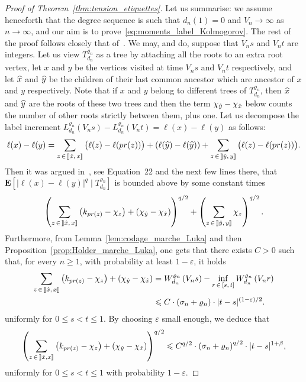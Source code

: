 \documentclass[10pt]{amsart}
\theoremstyle{definition}\newtheorem{defi}[theo]{Definition}\newtheorem{rema}[theo]{Remark}\newtheorem{exam}[theo]{Example}\newtheorem{exem}[theo]{Example}\newtheorem{nota}[theo]{Notation}
\newcommand{\rrbracket}{\mathclose{]\mkern -2.7mu]}}
\newcommand{\ensembles}[1]{\mathbf{#1}}
\newcommand{\E}{\ensembles{E}}
\newcommand{\1}{\ensembles{1}}
\renewcommand{\le}{\leqslant}
\renewcommand{\ge}{\geqslant}
\newcommand{\fn}{T_{d_n}^{\varrho_n}}
\newcommand{\Wfn}{W_{d_n}^{\varrho_n}}
\newcommand{\Lfn}{L_{d_n}^{\varrho_n}}
\newcommand{\vertices}{V}
\let\oldhat\hat
\renewcommand*{\hat}[1]{\mathchoice{\widehat{#1}}{\widehat{#1}}{\oldhat{#1}}{\oldhat{#1}}}
\providecommand{\?}{}
\begin{document}
\begin{proof}[Proof of Theorem~\ref{thm:tension_etiquettes}]
Let us summarise: we assume henceforth that the degree sequence is such that $d_{n}(1) = 0$ and $\vertices_{n} \to \infty$ as $n\to \infty$, and our aim is to prove~\eqref{eq:moments_label_Kolmogorov}. The rest of the proof follows closely that of~\cite[Proposition~7]{Mar18b}. We may, and do, suppose that $\vertices_n s$ and $\vertices_n t$ are integers. Let us view $\fn$ as a tree by attaching all the roots to an extra root vertex, let $x$ and $y$ be the vertices visited at time $\vertices_n s$ and $\vertices_n t$ respectively, and let $\hat{x}$ and $\hat{y}$ be the children of their last common ancestor which are ancestor of $x$ and $y$ respectively. Note that if $x$ and $y$ belong to different trees of $\fn$, then $\hat{x}$ and $\hat{y}$ are the roots of these two trees and then the term $\chi_{\hat{y}} - \chi_{\hat{x}}$ below counts the number of other roots strictly between them, plus one. Let us decompose the label increment $\Lfn(\vertices_n s) - \Lfn(\vertices_n t) = \ell(x)-\ell(y)$ as follows:
\[
\ell(x)-\ell(y) = \sum_{z\,\in\,\mathopen{\rrbracket} \hat{x},\,x \mathclose{\rrbracket}} \big(\ell(z)-\ell(pr(z))\big) + (\ell(\hat{y})-\ell(\hat{y})) + \sum_{z\,\in\,\mathopen{\rrbracket} \hat{y},\,y \mathclose{\rrbracket}} \big(\ell(z)-\ell(pr(z))\big).
\]
Then it was argued in~\cite{Mar18b}, see Equation~22 and the next few lines there, that $\E[|\ell(x)-\ell(y)|^q \mid \fn]$ is bounded above by some constant times
\[
\left(\sum_{z\,\in\,\mathopen{\rrbracket} \hat{x},\,x \mathclose{\rrbracket}} \left(k_{pr(z)}-\chi_{z}\right) + \left(\chi_{\hat{y}} - \chi_{\hat{x}}\right)\right)^{q/2} + \left(\sum_{z\,\in\,\mathopen{\rrbracket} \hat{y},\,y \mathclose{\rrbracket}} \chi_{z}\right)^{q/2}.
\]
Furthermore, from Lemma~\ref{lem:codage_marche_Luka} and then Proposition~\ref{prop:Holder_marche_Luka}, one gets that there exists $C > 0$ such that, for every $n \ge 1$, with probability at least $1-\varepsilon$, it holds
\begin{align*}
\sum_{z\,\in\,\mathopen{\rrbracket} \hat{x},\,x \mathclose{\rrbracket}} \left(k_{pr(z)}-\chi_{z}\right) + \left(\chi_{\hat{y}} - \chi_{\hat{x}}\right) &= \Wfn\left(\vertices_n s\right) - \inf_{r\,\in\,[s,\,t]} \Wfn\left(\vertices_n r\right)
\\
&\le C \cdot\left(\sigma_n + \varrho_n\right) \cdot |t-s|^{(1-\varepsilon)/2}.
\end{align*}
uniformly for $0 \le s < t \le 1$. By choosing $\varepsilon$ small enough, we deduce that
\[
\left(\sum_{z\,\in\,\mathopen{\rrbracket} \hat{x}, x \mathclose{\rrbracket}} \left(k_{pr(z)}-\chi_{z}\right) + \left(\chi_{\hat{y}} - \chi_{\hat{x}}\right)\right)^{q/2}
\le C^{q/2} \cdot \left(\sigma_n + \varrho_n\right)^{q/2} \cdot |t-s|^{1+\beta},
\]
uniformly for $0 \le s < t \le 1$ with probability $1-\varepsilon$.



\end{proof}
\end{document}
